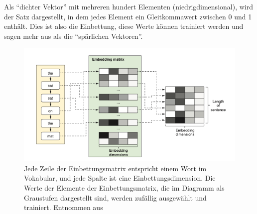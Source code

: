 Als \enquote{dichter Vektor} mit mehreren hundert Elementen (niedrigdimensional), wird der Satz dargestellt, in dem jedes Element ein Gleitkommawert zwischen 0 und 1 enthält. Dies ist also die Einbettung, diese Werte können trainiert werden und sagen mehr aus als die \enquote{spärlichen Vektoren}.
\begin{figure}[H]
    \centering
    \includegraphics[width=13cm]{kapitel3/embd.png}
    \caption[Darstellung der Worteinbettungen]{Jede Zeile der Einbettungsmatrix entspricht einem Wort im Vokabular, und jede Spalte ist eine Einbettungsdimension. Die Werte der Elemente der Einbettungsmatrix, die im Diagramm als Graustufen dargestellt sind, werden zufällig ausgewählt und trainiert. Entnommen aus \cite[311]{cai2020deep}}
    \label{wordembgrau}
\end{figure}

